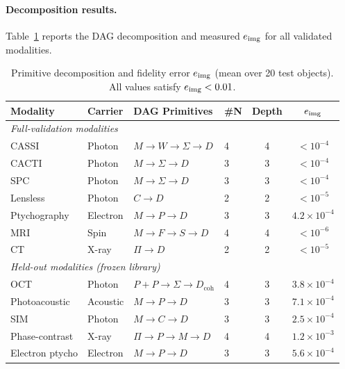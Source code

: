 \paragraph{Decomposition results.}
Table~\ref{tab:decomposition_main} reports the DAG decomposition and measured $e_{\mathrm{img}}$ for all validated modalities.

\begin{table}[h]
\centering\small
\setlength{\tabcolsep}{5pt}
\caption{Primitive decomposition and fidelity error $e_{\mathrm{img}}$ (mean over 20 test objects). All values satisfy $e_{\mathrm{img}} < 0.01$.}
\label{tab:decomposition_main}
\begin{tabular}{@{}llllcc@{}}
\toprule
Modality & Carrier & DAG Primitives & \#N & Depth & $e_{\mathrm{img}}$ \\
\midrule
\multicolumn{6}{l}{\textit{Full-validation modalities}} \\
CASSI         & Photon   & $M \!\to\! W \!\to\! \Sigma \!\to\! D$      & 4 & 4 & $< 10^{-4}$ \\
CACTI         & Photon   & $M \!\to\! \Sigma \!\to\! D$                & 3 & 3 & $< 10^{-4}$ \\
SPC           & Photon   & $M \!\to\! \Sigma \!\to\! D$                & 3 & 3 & $< 10^{-4}$ \\
Lensless      & Photon   & $C \!\to\! D$                               & 2 & 2 & $< 10^{-5}$ \\
Ptychography  & Electron & $M \!\to\! P \!\to\! D$                     & 3 & 3 & $4.2 \times 10^{-4}$ \\
MRI           & Spin     & $M \!\to\! F \!\to\! S \!\to\! D$           & 4 & 4 & $< 10^{-6}$ \\
CT            & X-ray    & $\Pi \!\to\! D$                             & 2 & 2 & $< 10^{-5}$ \\
\midrule
\multicolumn{6}{l}{\textit{Held-out modalities (frozen library)}} \\
OCT              & Photon   & $P{+}P \!\to\! \Sigma \!\to\! D_{\mathrm{coh}}$ & 4 & 3 & $3.8 \times 10^{-4}$ \\
Photoacoustic    & Acoustic & $M \!\to\! P \!\to\! D$                   & 3 & 3 & $7.1 \times 10^{-4}$ \\
SIM              & Photon   & $M \!\to\! C \!\to\! D$                   & 3 & 3 & $2.5 \times 10^{-4}$ \\
Phase-contrast   & X-ray    & $\Pi \!\to\! P \!\to\! M \!\to\! D$      & 4 & 4 & $1.2 \times 10^{-3}$ \\
Electron ptycho  & Electron & $M \!\to\! P \!\to\! D$                   & 3 & 3 & $5.6 \times 10^{-4}$ \\

\end{tabular}
\end{table}
